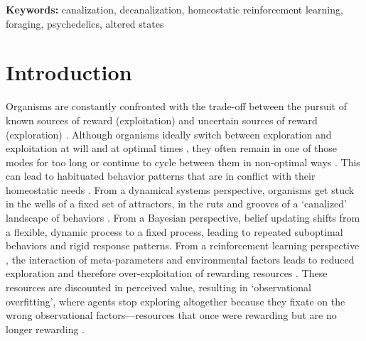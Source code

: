 \documentclass[12pt,fleqn]{article}
\begin{document}
\vspace{0.5em}
\noindent\textbf{Keywords:} canalization, decanalization, homeostatic reinforcement learning, foraging, psychedelics, altered states

\section{Introduction}

Organisms are constantly confronted with the trade-off between the pursuit of known sources of reward (exploitation) and uncertain sources of reward (exploration) \cite{stephens_foraging_1986}. Although organisms ideally switch between exploration and exploitation at will and at optimal times \cite{pearson_decision_2014}, they often remain in one of those modes for too long or continue to cycle between them in non-optimal ways \cite{barack_neurocomputational_2016, addicott_primer_2017}. This can lead to habituated behavior patterns that are in conflict with their homeostatic needs \cite{bernard_lectures_1974}. From a dynamical systems perspective, organisms get stuck in the wells of a fixed set of attractors, in the ruts and grooves of a ‘canalized’ landscape of behaviors \cite{waddington_canalization_1959, carhart-harris_canalization_2023}. From a Bayesian perspective, belief updating shifts from a flexible, dynamic process to a fixed process, leading to repeated suboptimal behaviors \cite{harle_anhedonia_2017} and rigid response patterns. From a reinforcement learning perspective \cite{sutton_reinforcement_1998}, the interaction of meta-parameters and environmental factors leads to reduced exploration and therefore over-exploitation of rewarding resources \cite{huys_mapping_2013}. These resources are discounted in perceived value, resulting in ‘observational overfitting’, where agents stop exploring altogether because they fixate on the wrong observational factors—resources that once were rewarding but are no longer rewarding \cite{song_observational_2019}.
\end{document}
